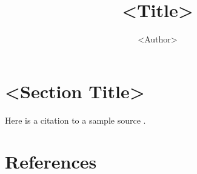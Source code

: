 \documentclass[stu,12pt,floatsintext]{apa7}
\title{<Title>}
\author{<Author>}
\begin{document}
\maketitle
\thispagestyle{plain}
\pagestyle{plain}

\section{<Section Title>}

Here is a citation to a sample source \parencite{sample2024}.

\section{References}

\printbibliography
\end{document}
